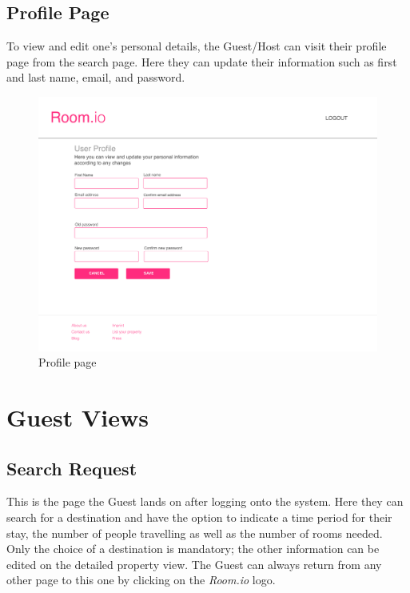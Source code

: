 \subsection{Profile Page}
To view and edit one's personal details, the Guest/Host can visit their profile page from the search page. Here they can update their information such as first and last name, email, and password.

\begin{figure}[H]
  \centering
  \includegraphics[width=17cm]{img/mockups/user_profile.pdf}
  \caption{Profile page}
  \label{Profile_View}
\end{figure}

\section{Guest Views}
\subsection{Search Request}
This is the page the Guest lands on after logging onto the system. Here they can search for a destination and have the option to indicate a time period for their stay, the number of people travelling as well as the number of rooms needed. Only the choice of a destination is mandatory; the other information can be edited on the detailed property view. The Guest can always return from any other page to this one by clicking on the \textit{Room.io} logo.

